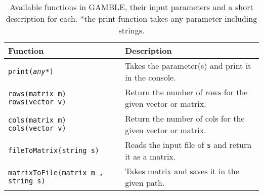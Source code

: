 \begin{table}[h]
    \centering
    \begin{tabular}{|l|p{8.5cm}|}
    \hline
    \textbf{Function}                                               &\textbf{Description}                                                                               \\ \hline
    \texttt{print(\textit{any*})}                                   &Takes the parameter(s) and print it in the console.                                                 \\ \hline 
    \parbox[t]{5cm}{\texttt{rows(matrix m)}\\\texttt{rows(vector v)}} &Return the number of rows for the given vector or matrix.                                          \\ \hline
    \parbox[t]{5cm}{\texttt{cols(matrix m)}\\\texttt{cols(vector v)}} &Return the number of cols for the given vector or matrix.                                          \\ \hline    
    \texttt{fileToMatrix(string s)}                                 &Reads the input file of \texttt{s} and return it as a matrix.                                        \\ \hline
    \texttt{matrixToFile(matrix m , string s)}                      &Takes matrix and saves it in the given path.                                                       \\ \hline  
    \end{tabular}
    \caption{Available functions in GAMBLE, their input parameters and a short description for each. *the print function takes any parameter including strings.}\label{tbl:funcs}
\end{table}
